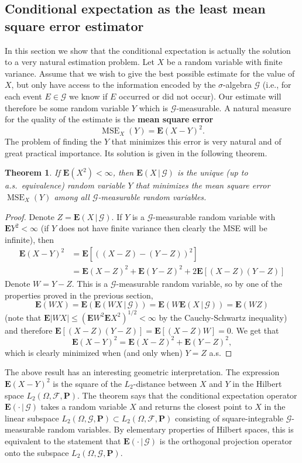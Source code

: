 \documentclass[12pt]{article}
\newtheorem{thm}{Theorem}[section]
\newcommand{\prob}{\mathbf{P}}
\newcommand{\expec}{\mathbf{E}}
\newcommand{\condexp}[2]{\expec\left(#1\,|\,#2\right)}
\theoremstyle{example}
\begin{document}
\subsection{Conditional expectation as the least mean square error estimator}

In this section we show that the conditional expectation is actually the solution to a very natural estimation problem. Let $X$ be a random variable with finite variance. Assume that we wish to give the best possible estimate for the value of $X$, but only have access to the information encoded by the $\sigma$-algebra $\mathcal{G}$ (i.e., for each event $E\in\mathcal{G}$ we know if $E$ occurred or did not occur). Our estimate will therefore be some random variable $Y$ which is $\mathcal{G}$-measurable. A natural measure for the quality of the estimate is the \textbf{mean square error}
$$ \operatorname{MSE}_X(Y) = \expec(X-Y)^2. $$
The problem of finding the $Y$ that minimizes this error is very natural and of great practical importance. Its solution is given in the following theorem.

\begin{thm} If $\expec(X^2)<\infty$, then $\condexp{X}{\mathcal{G}}$ is the unique (up to a.s.\ equivalence) random variable $Y$ that minimizes the mean square error $\operatorname{MSE}_X(Y)$ among all $\mathcal{G}$-measurable random variables.
\end{thm}

\begin{proof} Denote $Z=\condexp{X}{\mathcal{G}}$. If $Y$ is a $\mathcal{G}$-measurable random variable with $\expec Y^2<\infty$ (if $Y$ does not have finite variance then clearly the MSE will be infinite), then
\begin{align*}
\expec(X-Y)^2 &= \expec[((X-Z)-(Y-Z))^2]
\\ &= \expec(X-Z)^2 + \expec(Y-Z)^2
+ 2 \expec[(X-Z)(Y-Z)]
\end{align*}
Denote $W=Y-Z$. This is a $\mathcal{G}$-measurable random variable, so by one of the properties proved in the previous section,
$$ \expec(WX) = \expec(\condexp{WX}{\mathcal{G}})
= \expec(W \condexp{X}{\mathcal{G}}) = \expec(WZ)
$$
(note that $\expec|WX|\le (\expec W^2 \expec X^2)^{1/2}<\infty$ by the Cauchy-Schwartz inequality) and therefore $\expec[(X-Z)(Y-Z)] = \expec[(X-Z)W]=0$. We get that
$$
\expec(X-Y)^2 = \expec(X-Z)^2 + \expec(Y-Z)^2, $$
which is clearly minimized when (and only when) $Y=Z$ a.s.
\end{proof}

The above result has an interesting geometric interpretation. The expression $\expec(X-Y)^2$ is the square of the $L_2$-distance between $X$ and $Y$ in the Hilbert space $L_2(\Omega, \mathcal{F},\prob)$. The theorem says that the conditional expectation operator $\condexp{\cdot}{\mathcal{G}}$ takes a random variable $X$ and returns the closest point to $X$ in the linear subspace $L_2(\Omega, \mathcal{G},\prob)\subset L_2(\Omega, \mathcal{F},\prob)$ consisting of square-integrable $\mathcal{G}$-measurable random variables. By elementary properties of Hilbert spaces, this is equivalent to the statement that $\condexp{\cdot}{\mathcal{G}}$ is the orthogonal projection operator onto the subspace $L_2(\Omega, \mathcal{G},\prob)$. 
\end{document}
